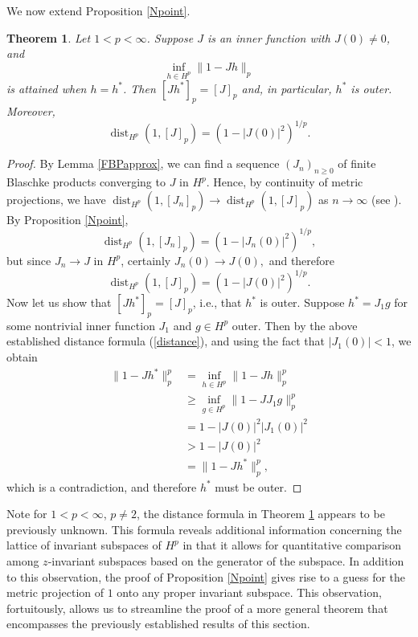 \documentclass{article}
\theoremstyle{plain}
\newtheorem{Theorem}{Theorem}
\numberwithin{Theorem}{section}
\numberwithin{equation}{section}
\theoremstyle{plain}
\theoremstyle{definition}
\renewcommand{\geq}{\geqslant}
\begin{document}
We now extend Proposition \ref{Npoint}. 




\begin{Theorem}\label{fstarnozero_0}
Let $1<p<\infty$.  Suppose $J$ is an inner function with $J(0)\neq 0$, and 
	\begin{equation}\label{ext_prob}
	\inf_{h\in H^p}\|1 - Jh\|_p
	\end{equation}
	is attained when $h = h^*$.  Then $[Jh^*]_p = [J]_p$ and, in particular, $h^*$ is outer.  Moreover, 
    \[
    \operatorname{dist}_{H^p} (1, [J]_p) = \left(1 - |J(0)|^2 \right)^{1/p}.
    \]

\end{Theorem}

\begin{proof}
By Lemma \ref{FBPapprox}, we can find a sequence $(J_n)_{n\ge0}$ of finite Blaschke products converging to $J$ in $H^p$.
Hence, by continuity of metric projections, we have $\operatorname{dist}_{H^p} (1, [J_n]_p) \to \operatorname{dist}_{H^p} (1, [J]_p)$ as $n\to\infty$ (see \cite[Proposition 4.8.1]{CMR}).
By Proposition \ref{Npoint}, 
\begin{equation*}
\operatorname{dist}_{H^p} (1, [J_n]_p) = \left(1 - |J_n(0)|^2 \right)^{1/p}, 
\end{equation*}
but since $J_n \rightarrow J$ in $H^p$, certainly $J_n(0) \rightarrow J(0),$ and therefore 
\begin{equation}\label{distance}
\operatorname{dist}_{H^p} (1, [J]_p) = \left(1 - |J(0)|^2 \right)^{1/p}.
\end{equation}
Now let us show that $[Jh^*]_p = [J]_p$, i.e., that $h^*$ is outer. Suppose $h^* = J_1 g$ for some nontrivial inner function $J_1$ and $g \in H^p$ outer. Then by the above established distance formula (\ref{distance}), and using the fact that $|J_1(0)| < 1$, we obtain 
\begin{align*}
\| 1 - Jh^* \|_p^p &= 
\inf_{h \in H^p} \| 1 - Jh \|_p^p\\
&\geq \inf_{g \in H^p} \| 1 - J J_1 g \|_p^p\\
&=  1 - |J(0)|^2 |J_1(0)|^2\\
&> 1 - |J(0)|^2\\
&= \| 1 - Jh^* \|_p^p,
\end{align*}
which is a contradiction, and therefore $h^*$ must be outer.
\end{proof}



Note for $1 < p < \infty$, $p \neq 2$, the distance formula in Theorem \ref{fstarnozero_0} appears to be previously unknown. This formula reveals additional information concerning the lattice of invariant subspaces of $H^p$ in that it allows for quantitative comparison among $z$-invariant subspaces based on the generator of the subspace.
In addition to this observation, the proof of Proposition \ref{Npoint} gives rise to a guess for the metric projection of $1$ onto any proper invariant subspace. This observation, fortuitously, allows us to streamline the proof of a more general theorem that encompasses the previously established results of this section. 
\end{document}
